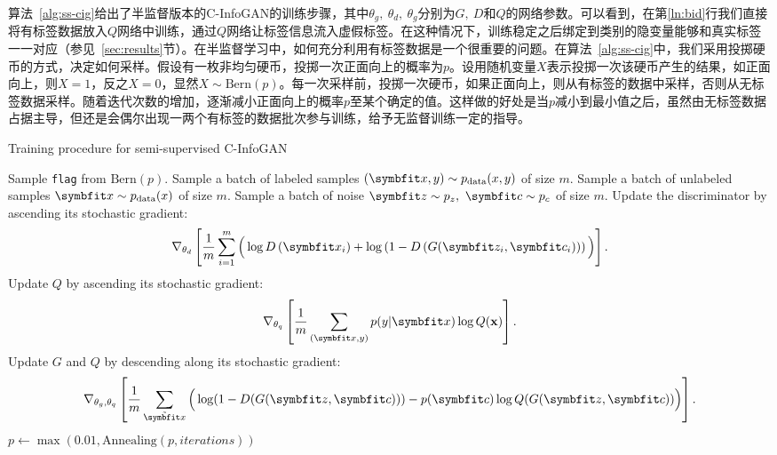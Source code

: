 算法~\ref{alg:ss-cig}给出了半监督版本的C-InfoGAN的训练步骤，其中$\theta_g, ~\theta_d, ~\theta_g$分别为$G, ~D$和$Q$的网络参数。可以看到，在第\ref{ln:bid}行我们直接将有标签数据放入$Q$网络中训练，通过$Q$网络让标签信息流入虚假标签。在这种情况下，训练稳定之后绑定到类别的隐变量能够和真实标签一一对应（参见~\ref{sec:results}节）。在半监督学习中，如何充分利用有标签数据是一个很重要的问题。在算法~\ref{alg:ss-cig}中，我们采用投掷硬币的方式，决定如何采样。假设有一枚非均匀硬币，投掷一次正面向上的概率为$p$。设用随机变量$X$表示投掷一次该硬币产生的结果，如正面向上，则$X=1$，反之$X=0$，显然$X\sim\text{Bern}(p)$。每一次采样前，投掷一次硬币，如果正面向上，则从有标签的数据中采样，否则从无标签数据采样。随着迭代次数的增加，逐渐减小正面向上的概率$p$至某个确定的值。这样做的好处是当$p$减小到最小值之后，虽然由无标签数据占据主导，但还是会偶尔出现一两个有标签的数据批次参与训练，给予无监督训练一定的指导。
\begin{algorithm}[htbp]
  \small
  \caption{Training procedure for semi-supervised C-InfoGAN}
  \label{alg:ss-cig}
  \begin{algorithmic}[1]
      \State Sample \texttt{flag} from $\text{Bern}(p)$.
        \State Sample a batch of labeled samples 
               $(\bd{x}, y) \sim p_{\text{data}}(x,y)$ of size $m$.
      \Else
        \State Sample a batch of unlabeled samples $\bd{x} \sim p_{\text{data}}(x)$ of
        size $m$.
      \EndIf
      \State Sample a batch of noise $\bd{z}\sim p_z, ~\bd{c}\sim p_c$ of size
      $m$.
      \State Update the discriminator by ascending its stochastic gradient:
      \[
        \nabla_{\theta_d} \left[ 
          \frac{1}{m} \sum_{i=1}^m \Big( 
            \log D\left(\bd{x}_i\right) + 
            \log\left( 1 - D\left( G(\bd{z}_i, \bd{c}_i) \right) \right)
          \Big)
        \right].
      \]
        \State Update $Q$ by ascending its stochastic gradient: \label{ln:bid}
        \[
          \nabla_{\theta_q} \left[ 
            \frac{1}{m} \sum_{(\bd{x}, y)} p(y|\bd{x}) \log Q(\bf{x}) 
          \right].
        \]
      \EndIf
      \State Update $G$ and $Q$ by descending along its stochastic gradient:
      \[
        \nabla_{\theta_g,\theta_q} \left[ 
          \frac{1}{m} \sum_{\tilde{\bd{x}}} \Big(
            \log(1 - D(G(\bd{z},\bd{c}))) -
            p(\bd{c})\log Q(G(\bd{z}, \bd{c}))
          \Big)
        \right]. \label{ln:test}
      \]
      \State $p \gets \max(0.01, \text{Annealing}(p, iterations))$ 
    \EndFor
  \end{algorithmic}
\end{algorithm}

